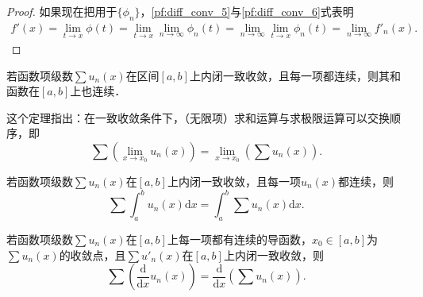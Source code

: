\documentclass[../../main.tex]{subfiles}%
\begin{document}
\begin{proof}
如果现在把用于$\{\phi_n\}$，\eqref{pf:diff_conv_5}与\eqref{pf:diff_conv_6}式表明
\begin{align*}
f\prime \left( x \right) =\lim_{t\rightarrow x} \phi \left( t \right) =\underset{t\rightarrow x}{\lim}\underset{n\rightarrow \infty}{\lim}\phi _n\left( t \right) =\underset{n\rightarrow \infty}{\lim}\underset{t\rightarrow x}{\lim}\phi _n\left( t \right) =\lim_{n\rightarrow \infty} f\prime _n(x).
\end{align*}
\end{proof}

\begin{theorem}[函数项级数的连续性]\label{theorem:函数项级数连续性定理}
若函数项级数\(\sum u_n(x)\)在区间\([a, b]\)上内闭一致收敛，且每一项都连续，则其和函数在\([a, b]\)上也连续．
\end{theorem}
\begin{remark}
这个定理指出：在一致收敛条件下，（无限项）求和运算与求极限运算可以交换顺序，即
\[
\sum \left( \lim_{x \to x_0} u_n(x) \right) = \lim_{x \to x_0} \left( \sum u_n(x) \right). 
\]
\end{remark}

\begin{theorem}[函数项级数逐项求积]\label{theorem:函数项级数逐项求积定理}
若函数项级数\(\sum u_n(x)\)在\([a, b]\)上内闭一致收敛，且每一项\(u_n(x)\)都连续，则
\[
\sum \int_a^b u_n(x) \mathrm{d}x = \int_a^b \sum u_n(x) \mathrm{d}x. 
\]
\end{theorem}

\begin{theorem}[函数项级数逐项求导]\label{theorem:函数项级数逐项求导定理}
若函数项级数\(\sum u_n(x)\)在\([a, b]\)上每一项都有连续的导函数，\(x_0 \in [a, b]\)为\(\sum u_n(x)\)的收敛点，且\(\sum u'_n(x)\)在\([a, b]\)上内闭一致收敛，则
\[
\sum \left( \frac{\mathrm{d}}{\mathrm{d}x} u_n(x) \right) = \frac{\mathrm{d}}{\mathrm{d}x} \left( \sum u_n(x) \right). 
\]
\end{theorem}
\end{document}
